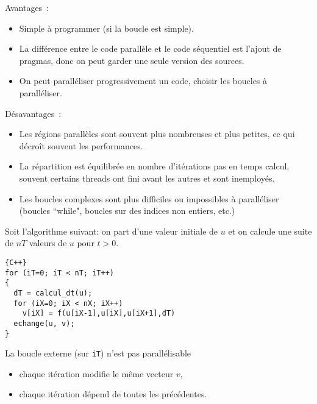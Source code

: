 \documentclass{beamer}
\begin{document}
\begin{frame}
	Avantages~:
	\begin{itemize}
		\item Simple à programmer (si la boucle est simple).
		
		\item La différence entre le code parallèle et le code séquentiel est l'ajout de pragmas, donc on peut garder une seule version des sources.
		
		\item On peut paralléliser progressivement un code, choisir les boucles à paralléliser.
	\end{itemize}

\vfill

	Désavantages~:
	\begin{itemize}
		\item Les régions parallèles sont souvent plus nombreuses et plus petites, ce qui décroît souvent les performances.
		\item La répartition est équilibrée en nombre d'itérations pas en temps calcul, souvent certains threads ont fini avant les autres et sont inemployés.
		\item Les boucles complexes sont plus difficiles ou impossibles à paralléliser (boucles ``while", boucles sur des indices non entiers, etc.)
	\end{itemize}
\end{frame}

\begin{frame}[fragile]
	Soit l'algorithme suivant: on part d'une valeur initiale de $u$ et on calcule une suite de $nT$ valeurs de $u$ pour $t > 0$.
	
	
	\begin{lstlisting}{C++}
for (iT=0; iT < nT; iT++)
{
  dT = calcul_dt(u);
  for (iX=0; iX < nX; iX++)
    v[iX] = f(u[iX-1],u[iX],u[iX+1],dT)
  echange(u, v);
}
	\end{lstlisting}
	
	\vfill
	La boucle externe (sur \verb|iT|) n'est pas parallélisable
	\begin{itemize}
		\item chaque itération modifie le même vecteur $v$,
		\item chaque itération dépend de toutes les précédentes.
	\end{itemize}
\end{frame}
\end{document}
